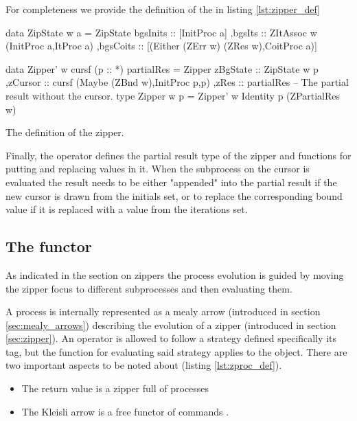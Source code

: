 For completeness we provide the definition of the  in
listing \ref{lst:zipper_def}

\begin{code}
\begin{haskellcode}
 data ZipState w a =
  ZipState
  { bgsInits :: [InitProc a]
   ,bgsIts :: ZItAssoc w (InitProc a,ItProc a)
   ,bgsCoits :: [(Either (ZErr w) (ZRes w),CoitProc a)]
  }

data Zipper' w cursf (p :: *) partialRes =
  Zipper
  { zBgState :: ZipState w p
   ,zCursor  :: cursf (Maybe (ZBnd w),InitProc p,p)
   ,zRes     :: partialRes -- The partial result without the cursor.
  }
type Zipper w p = Zipper' w Identity p (ZPartialRes w)
\end{haskellcode}
  \caption{\label{lst:zipper_def}The definition of the zipper.}
\end{code}

Finally, the operator defines the partial result type of the zipper
 and functions for putting and replacing values in
it. When the subprocess on the cursor is evaluated the result needs to
be either "appended" into the partial result if the new cursor is
drawn from the initials set, or to replace the corresponding bound
value if it is replaced with a value from the iterations set.

\subsection{The  functor}
\label{sec:cmds_functor}

As indicated in the section on zippers the process evolution is guided
by moving the zipper focus to different subprocesses and then
evaluating them.

A process is internally represented as a mealy arrow (introduced in
section \ref{sec:mealy_arrows}) describing the evolution of a zipper
(introduced in section \ref{sec:zipper}). An operator is allowed to
follow a strategy defined specifically its  tag,
but the function for evaluating said strategy applies to the
 object. There are two important aspects to be noted about
 (listing \ref{lst:zproc_def}).

\begin{itemize}
\item The return value is a zipper full of processes 
\item The Kleisli arrow is a free functor of commands .
\end{itemize}

